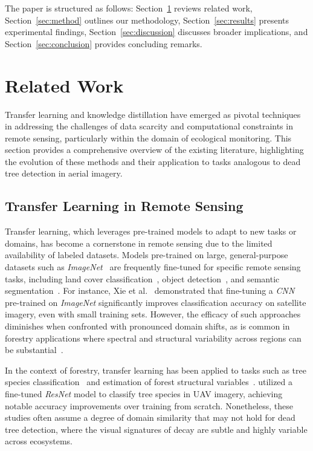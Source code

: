 \documentclass[twocolumn]{article}
\begin{document}
The paper is structured as follows: Section~\ref{sec:related} reviews related work, Section~\ref{sec:method} outlines our methodology, Section~\ref{sec:results} presents experimental findings, Section~\ref{sec:discussion} discusses broader implications, and Section~\ref{sec:conclusion} provides concluding remarks.

\section{Related Work}
\label{sec:related}

Transfer learning and knowledge distillation have emerged as pivotal techniques in addressing the challenges of data scarcity and computational constraints in remote sensing, particularly within the domain of ecological monitoring. This section provides a comprehensive overview of the existing literature, highlighting the evolution of these methods and their application to tasks analogous to dead tree detection in aerial imagery.

\subsection{Transfer Learning in Remote Sensing}

Transfer learning, which leverages pre-trained models to adapt to new tasks or domains, has become a cornerstone in remote sensing due to the limited availability of labeled datasets. Models pre-trained on large, general-purpose datasets such as \textit{ImageNet}~\citep{deng2009imagenet} are frequently fine-tuned for specific remote sensing tasks, including land cover classification~\citep{xie2016transfer}, object detection~\citep{chen2022object}, and semantic segmentation~\citep{zhang2016deep}. For instance, Xie et al.~\citep{xie2016transfer} demonstrated that fine-tuning a \textit{CNN} pre-trained on \textit{ImageNet} significantly improves classification accuracy on satellite imagery, even with small training sets. However, the efficacy of such approaches diminishes when confronted with pronounced domain shifts, as is common in forestry applications where spectral and structural variability across regions can be substantial~\citep{tuia2016domain}.

In the context of forestry, transfer learning has been applied to tasks such as tree species classification~\citep{kellenberger2018detecting} and estimation of forest structural variables~\citep{fassnacht2016review}. \cite{kellenberger2018detecting} utilized a fine-tuned \textit{ResNet} model to classify tree species in UAV imagery, achieving notable accuracy improvements over training from scratch. Nonetheless, these studies often assume a degree of domain similarity that may not hold for dead tree detection, where the visual signatures of decay are subtle and highly variable across ecosystems.
\end{document}
